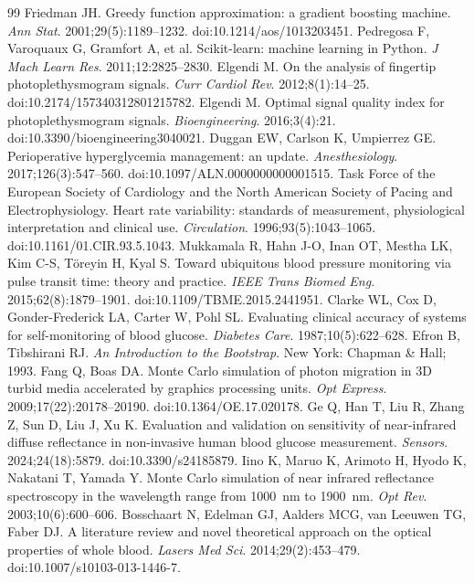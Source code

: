 \documentclass[11pt]{article}
\begin{document}
\begin{thebibliography}{99}
 Friedman JH. Greedy function approximation: a gradient boosting machine. \emph{Ann Stat}. 2001;29(5):1189--1232. doi:10.1214/aos/1013203451.
 Pedregosa F, Varoquaux G, Gramfort A, et al. Scikit-learn: machine learning in Python. \emph{J Mach Learn Res}. 2011;12:2825--2830.
 Elgendi M. On the analysis of fingertip photoplethysmogram signals. \emph{Curr Cardiol Rev}. 2012;8(1):14--25. doi:10.2174/157340312801215782.
 Elgendi M. Optimal signal quality index for photoplethysmogram signals. \emph{Bioengineering}. 2016;3(4):21. doi:10.3390/bioengineering3040021.
 Duggan EW, Carlson K, Umpierrez GE. Perioperative hyperglycemia management: an update. \emph{Anesthesiology}. 2017;126(3):547--560. doi:10.1097/ALN.0000000000001515.
 Task Force of the European Society of Cardiology and the North American Society of Pacing and Electrophysiology. Heart rate variability: standards of measurement, physiological interpretation and clinical use. \emph{Circulation}. 1996;93(5):1043--1065. doi:10.1161/01.CIR.93.5.1043.
 Mukkamala R, Hahn J-O, Inan OT, Mestha LK, Kim C-S, T\"oreyin H, Kyal S. Toward ubiquitous blood pressure monitoring via pulse transit time: theory and practice. \emph{IEEE Trans Biomed Eng}. 2015;62(8):1879--1901. doi:10.1109/TBME.2015.2441951.
 Clarke WL, Cox D, Gonder-Frederick LA, Carter W, Pohl SL. Evaluating clinical accuracy of systems for self-monitoring of blood glucose. \emph{Diabetes Care}. 1987;10(5):622--628.
 Efron B, Tibshirani RJ. \emph{An Introduction to the Bootstrap}. New York: Chapman \& Hall; 1993.
 Fang Q, Boas DA. Monte Carlo simulation of photon migration in 3D turbid media accelerated by graphics processing units. \emph{Opt Express}. 2009;17(22):20178--20190. doi:10.1364/OE.17.020178.
 Ge Q, Han T, Liu R, Zhang Z, Sun D, Liu J, Xu K. Evaluation and validation on sensitivity of near-infrared diffuse reflectance in non-invasive human blood glucose measurement. \emph{Sensors}. 2024;24(18):5879. doi:10.3390/s24185879.
 Iino K, Maruo K, Arimoto H, Hyodo K, Nakatani T, Yamada Y. Monte Carlo simulation of near infrared reflectance spectroscopy in the wavelength range from 1000~nm to 1900~nm. \emph{Opt Rev}. 2003;10(6):600--606.
 Bosschaart N, Edelman GJ, Aalders MCG, van Leeuwen TG, Faber DJ. A literature review and novel theoretical approach on the optical properties of whole blood. \emph{Lasers Med Sci}. 2014;29(2):453--479. doi:10.1007/s10103-013-1446-7.

\end{thebibliography}
\end{document}
